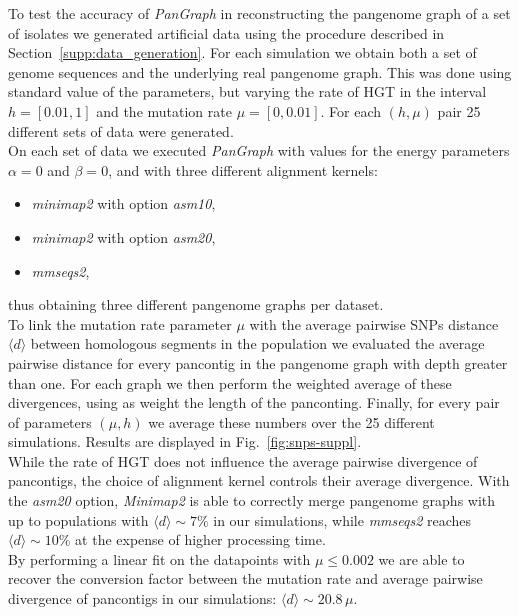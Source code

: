 \documentclass[aps,rmp,reprint,superscriptaddress,notitlepage,10pt,onecolumn]{revtex4-1}
\newcommand{\avg}[1]{\langle #1 \rangle}
\begin{document}
To test the accuracy of \textit{PanGraph} in reconstructing the pangenome graph of a set of isolates we generated artificial data using the procedure described in Section~\ref{supp:data_generation}. For each simulation we obtain both a set of genome sequences and the underlying real pangenome graph. This was done using standard value of the parameters, but varying the rate of HGT in the interval $h=[0.01,1]$ and the mutation rate $\mu=[0,0.01]$. For each $(h,\mu)$ pair 25 different sets of data were generated.\\
On each set of data we executed \textit{PanGraph} with values for the energy parameters $\alpha=0$ and $\beta=0$, and with three different alignment kernels:
\begin{itemize}
    \itemsep1pt
    \item \textit{minimap2} with option \textit{asm10},
    \item \textit{minimap2} with option \textit{asm20},
    \item \textit{mmseqs2},
\end{itemize}
thus obtaining three different pangenome graphs per dataset.\\
To link the mutation rate parameter $\mu$ with the average pairwise SNPs distance $\avg{d}$ between homologous segments in the population we evaluated the average pairwise distance for every pancontig in the pangenome graph with depth greater than one. For each graph we then perform the weighted average of these divergences, using as weight the length of the panconting. Finally, for every pair of parameters $(\mu,h)$ we average these numbers over the 25 different simulations. Results are displayed in Fig.~\ref{fig:snps-suppl}.\\
While the rate of HGT does not influence the average pairwise divergence of pancontigs, the choice of alignment kernel controls their average divergence. With the \textit{asm20} option, \textit{Minimap2} is able to correctly merge pangenome graphs with up to populations with $\avg{d} \sim 7\%$ in our simulations, while \textit{mmseqs2} reaches $\avg{d} \sim 10\%$ at the expense of higher processing time.\\
By performing a linear fit on the datapoints with $\mu \leq 0.002$ we are able to recover the conversion factor between the mutation rate and average pairwise divergence of pancontigs in our simulations: $\avg{d} \sim 20.8 \, \mu$.
\end{document}
